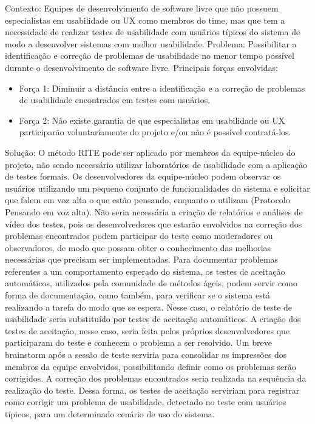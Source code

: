 Contexto: Equipes de desenvolvimento de software livre que não possuem especialistas em usabilidade ou UX como membros do time, mas que tem a necessidade de realizar testes de usabilidade com usuários típicos do sistema de modo a desenvolver sistemas com melhor usabilidade.
Problema: Possibilitar a identificação e correção de problemas de usabilidade no menor tempo possível durante o desenvolvimento de software livre. Principais forças envolvidas:
\begin{itemize}
\item Força 1: Diminuir a distância entre a identificação e a correção de problemas de usabilidade encontrados em testes com usuários.
\item Força 2: Não existe garantia de que especialistas em usabilidade ou UX participarão voluntariamente do projeto e/ou não é possível contratá-los.
\end{itemize}
Solução: O método RITE pode ser aplicado por membros da equipe-núcleo do projeto, não sendo
necessário utilizar laboratórios de usabilidade com a aplicação de testes formais. Os desenvolvedores da equipe-núcleo podem observar os usuários utilizando um pequeno conjunto de funcionalidades do sistema e solicitar que falem em voz alta o que estão pensando, enquanto o utilizam (Protocolo Pensando em voz alta). Não seria necessária a criação de relatórios e análises de vídeo dos testes, pois os desenvolvedores que estarão envolvidos na correção dos problemas encontrados podem participar do teste como moderadores ou observadores, de modo que possam obter o conhecimento das melhorias necessárias que precisam ser implementadas. Para documentar problemas referentes a um comportamento esperado do sistema, os testes de aceitação automáticos, utilizados pela comunidade de métodos ágeis, podem servir como forma de documentação, como também, para verificar se o sistema está realizando a tarefa do modo que se espera. Nesse caso, o relatório de teste de usabilidade seria substituído por testes de aceitação automáticos. A criação dos testes de aceitação, nesse caso, seria feita pelos próprios desenvolvedores que participaram do teste e conhecem o problema a ser resolvido. Um breve brainstorm após a sessão de teste serviria para consolidar as impressões dos membros da equipe envolvidos, possibilitando definir como os problemas serão corrigidos. A correção dos problemas encontrados seria realizada na sequência da realização do teste. Dessa forma, os testes de aceitação serviriam para registrar como corrigir um problema de usabilidade, detectado no teste com usuários típicos, para um determinado cenário de uso do sistema.

